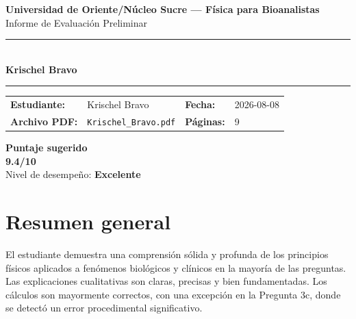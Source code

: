 \documentclass[11pt,a4paper]{article}
\begin{document}
\begin{center}
  {\Large\bfseries\color{azulTitulo} Universidad de Oriente/Núcleo Sucre --- Física para Bioanalistas}\\[4pt]
  {\large Informe de Evaluación Preliminar}\\[12pt]
  \rule{\linewidth}{1.2pt}\\[6pt]
  {\LARGE\bfseries Krischel Bravo}\\[4pt]
  \rule{\linewidth}{0.6pt}
\end{center}

\vspace{4pt}
\begin{tcolorbox}[cajaTitulo, title=Datos del informe]
\begin{tabular}{@{}llll@{}}
  \textbf{Estudiante:}  & Krischel Bravo  &
  \textbf{Fecha:}       & 2026-08-08 \\[4pt]
  \textbf{Archivo PDF:} & \texttt{Krischel\_Bravo.pdf}  &
  \textbf{Páginas:}     & 9 \\
\end{tabular}
\end{tcolorbox}

\vspace{6pt}
\begin{center}
  \begin{tcolorbox}[
    enhanced,
    colback=white, colframe=desempeno_excelente,
    width=0.62\linewidth,
    boxrule=2pt,
    halign=center, valign=center,
    top=8pt, bottom=8pt,
  ]
    \centering
    {\large\bfseries Puntaje sugerido}\\[6pt]
    {\Huge\bfseries\color{desempeno_excelente} 9.4/10}\\[6pt]
    {\large Nivel de desempeño: \textbf{\color{desempeno_excelente} Excelente}}
  \end{tcolorbox}
\end{center}

\section*{Resumen general}
El estudiante demuestra una comprensión sólida y profunda de los principios físicos aplicados a fenómenos biológicos y clínicos en la mayoría de las preguntas. Las explicaciones cualitativas son claras, precisas y bien fundamentadas. Los cálculos son mayormente correctos, con una excepción en la Pregunta 3c, donde se detectó un error procedimental significativo.
\end{document}
